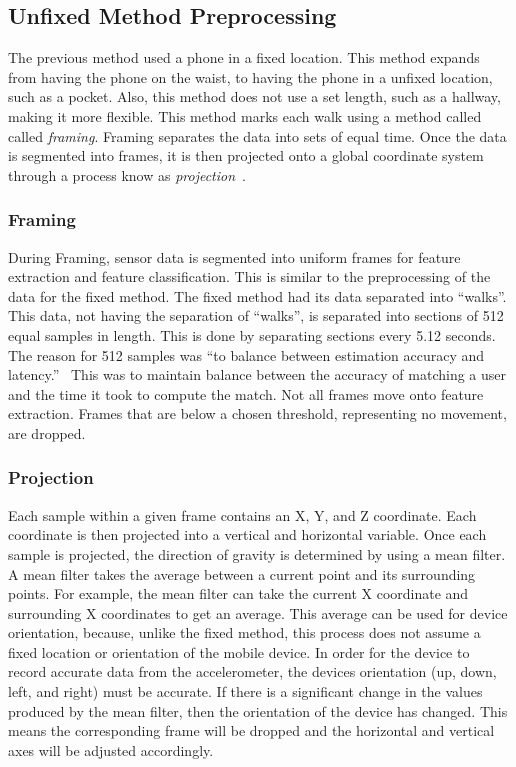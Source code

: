 \documentclass{sig-alternate}
\begin{document}
	
\subsection{Unfixed Method Preprocessing}
	The previous method used a phone in a fixed location. This method expands from having the phone on the waist, to having the phone in a unfixed location, such as a pocket. Also, this method does not use a set length, such as a hallway, making it more flexible. This method marks each walk using a method called called \textit{framing}. Framing separates the data into sets of equal time. Once the data is segmented into frames, it is then projected onto a global coordinate system through a process know as \textit{projection}~\cite{Lu:2014}.
		
		
			
\subsubsection{Framing}{
 During Framing, sensor data is segmented into uniform frames for feature extraction and feature classification. This is similar to the preprocessing of the data for the fixed method. The fixed method had its data separated into ``walks''. This data, not having the separation of ``walks'', is separated into sections of 512 equal samples in length. This is done by separating sections every 5.12 seconds. The reason for 512 samples was ``to balance between estimation accuracy and latency.''~\cite{Lu:2014} This was to maintain balance between the accuracy of matching a user and the time it took to compute the match. Not all frames move onto feature extraction. Frames that are below a chosen threshold, representing no movement, are dropped. }
 			
\subsubsection{Projection}{
	Each sample within a given frame contains an X, Y, and Z coordinate. Each coordinate is then projected into a vertical and horizontal variable. Once each sample is projected, the direction of gravity is determined by using a mean filter. A mean filter takes the average between a current point and its surrounding points. For example, the mean filter can take the current X coordinate and surrounding X coordinates to get an average. This average can be used for device orientation, because, unlike the fixed method, this process does not assume a fixed location or orientation of the mobile device. In order for the device to record accurate data from the accelerometer, the devices orientation (up, down, left, and right) must be accurate. If there is a significant change in the values produced by the mean filter, then the orientation of the device has changed. This means the corresponding frame will be dropped and the horizontal and vertical axes will be adjusted accordingly. 
}
\end{document}
